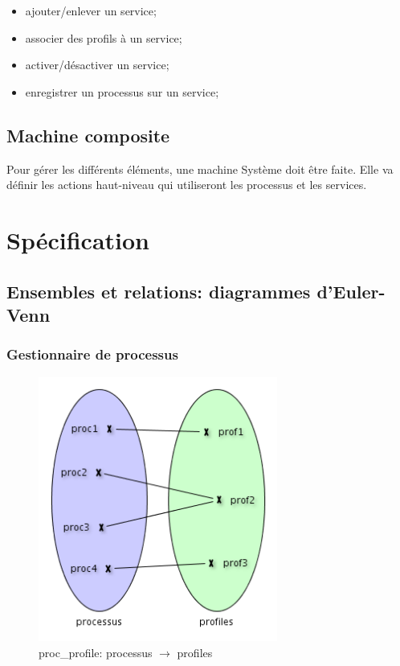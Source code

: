 \documentclass[french, titlepage, 11pt, a4paper]{article}
\begin{document}
            \begin{itemize}
                \item ajouter/enlever un service;
                \item associer des profils à un service;
                \item activer/désactiver un service;
                \item enregistrer un processus sur un service;
            \end{itemize}


\subsection{Machine composite}

Pour gérer les différents éléments, une machine Système doit être faite.
Elle va définir les actions haut-niveau qui utiliseront les processus et les
services.

\section{Spécification}

\subsection{Ensembles et relations: diagrammes d'Euler-Venn}

\subsubsection{Gestionnaire de processus}

\begin{figure}[htb]
  \centering
  \includegraphics[width=0.7\textwidth]{proc_profile.png}
  \caption{proc\_profile: processus $\rightarrow$ profiles}
  \label{fig:proc_profile}
\end{figure}
\end{document}
